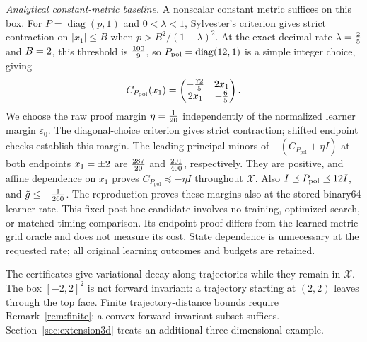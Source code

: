\documentclass[12pt,onecolumn,journal]{IEEEtran}
\newcommand{\X}{\mathcal{X}}
\begin{document}
\noindent\textit{Analytical constant-metric baseline.}
A nonscalar constant metric suffices on this box. For $P=\operatorname{diag}(p,1)$ and $0<\lambda<1$, Sylvester's criterion gives strict contraction on $|x_1|\le B$ when $p>B^2/(1-\lambda)^2$. At the exact decimal rate $\lambda=\frac{2}{5}$ and $B=2$, this threshold is $\frac{100}{9}$, so $P_{\mathrm{pol}}=\operatorname{diag}(12,1)$ is a simple integer choice, giving
\[
C_{P_{\mathrm{pol}}}(x_1)=
\begin{pmatrix}-\frac{72}{5} & 2 x_1\\
2 x_1 & -\frac{6}{5}\end{pmatrix}.
\]
We choose the raw proof margin $\eta=\frac{1}{20}$ independently of the normalized learner margin $\varepsilon_0$. The diagonal-choice criterion gives strict contraction; shifted endpoint checks establish this margin. The leading principal minors of $-(C_{P_{\mathrm{pol}}}+\eta I)$ at both endpoints $x_1=\pm2$ are $\frac{287}{20}$ and $\frac{201}{400}$, respectively. They are positive, and affine dependence on $x_1$ proves $C_{P_{\mathrm{pol}}}\preceq-\eta I$ throughout $\X$. Also $I\preceq P_{\mathrm{pol}}\preceq12 I$, and $\tilde g\le-\frac{1}{260}$. The reproduction proves these margins also at the stored binary64 learner rate. This fixed post hoc candidate involves no training, optimized search, or matched timing comparison. Its endpoint proof differs from the learned-metric grid oracle and does not measure its cost. State dependence is unnecessary at the requested rate; all original learning outcomes and budgets are retained.

The certificates give variational decay along trajectories while they remain in $\X$. The box $[-2,2]^2$ is not forward invariant: a trajectory starting at $(2,2)$ leaves through the top face. Finite trajectory-distance bounds require Remark~\ref{rem:finite}; a convex forward-invariant subset suffices. Section~\ref{sec:extension3d} treats an additional three-dimensional example.
\end{document}
